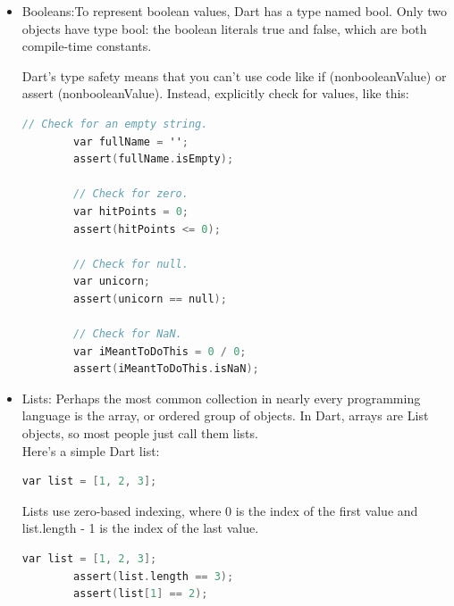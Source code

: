 \begin{itemize}
\begin{lstlisting}[language=C]
 	var s2 = 'The + operator ' + 'works, as well.';
 	assert(s2 == 'The + operator works, as well.');
 \end{lstlisting}
Another way to create a multi-line string: use a triple quote with either single or double quotation marks:
\begin{lstlisting}[language=C]
	var s1 = '''
	You can create
	multi-line strings like this one.
	''';
	
	var s2 = """This is also a
	multi-line string.""";
\end{lstlisting}
You can create a “raw” string by prefixing it with r:
\begin{lstlisting}[language=C]
	var s = r'In a raw string, not even \n gets special treatm
\end{lstlisting}
	\item Booleans:To represent boolean values, Dart has a type named bool. Only two objects have type bool: the boolean literals true and false, which are both compile-time constants.
	
	Dart's type safety means that you can't use code like if (nonbooleanValue) or assert (nonbooleanValue). Instead, explicitly check for values, like this:
	\begin{lstlisting}[language=C]
		// Check for an empty string.
		var fullName = '';
		assert(fullName.isEmpty);
		
		// Check for zero.
		var hitPoints = 0;
		assert(hitPoints <= 0);
		
		// Check for null.
		var unicorn;
		assert(unicorn == null);
		
		// Check for NaN.
		var iMeantToDoThis = 0 / 0;
		assert(iMeantToDoThis.isNaN);
	\end{lstlisting}
	
	\item Lists: Perhaps the most common collection in nearly every programming language is the array, or ordered group of objects. In Dart, arrays are List objects, so most people just call them lists.\\Here's a simple Dart list:
	\begin{lstlisting}[language=C]
		var list = [1, 2, 3];
	\end{lstlisting}
	Lists use zero-based indexing, where 0 is the index of the first value and list.length - 1 is the index of the last value.
	\begin{lstlisting}[language=C]
		var list = [1, 2, 3];
		assert(list.length == 3);
		assert(list[1] == 2);
		

\end{lstlisting}
\end{itemize}
